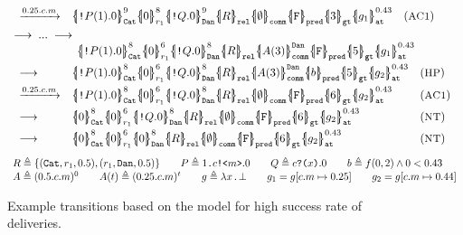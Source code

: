 \begin{figure}[t]
{\[\begin{array}{l}
\begin{array}{lll}
\xrightarrow{0.25.c.m}&
\pcellb{\comp{P(1).0}}{9}{\cn{Cat}}
\pcellb{0}{8}{r_1}
\pcellb{\comp{Q.0}}{9}{\cn{Dan}} 
\qcellb{R}{\cn{rel}}
\qcellb{\emptyset}{\cn{comm}}
\qcellb{\cn{F}}{\cn{pred}}
\qcellb{3}{\cn{gt}}
\pcellb{g_1}{0.43}{\cn{at}}
&
(\rulelab{AC1})
\end{array}
\\[0.5em]
\longrightarrow\;...\;\longrightarrow\\
\qquad\qquad\quad\;\;
\pcellb{\comp{P(1).0}}{8}{\cn{Cat}}
\pcellb{0}{6}{r_1}
\pcellb{\comp{Q.0}}{8}{\cn{Dan}} 
\qcellb{R}{\cn{rel}}
\pcellb{A(3)}{\cn{Dan}}{\cn{comm}}
\qcellb{\cn{F}}{\cn{pred}}
\qcellb{5}{\cn{gt}}
\pcellb{g_1}{0.43}{\cn{at}}
\\[0.5em]
\begin{array}{lll}
\longrightarrow&
\pcellb{\comp{P(1).0}}{8}{\cn{Cat}}
\pcellb{0}{6}{r_1}
\pcellb{\comp{Q.0}}{8}{\cn{Dan}} 
\qcellb{R}{\cn{rel}}
\pcellb{A(3)}{\cn{Dan}}{\cn{comm}}
\qcellb{b}{\cn{pred}}
\qcellb{5}{\cn{gt}}
\pcellb{g_2}{0.43}{\cn{at}}
&
(\rulelab{HP})
\\[0.5em]
\xrightarrow{0.25.c.m}  &
\pcellb{\comp{P(1).0}}{8}{\cn{Cat}}
\pcellb{0}{6}{r_1}
\pcellb{\comp{Q.0}}{8}{\cn{Dan}} 
\qcellb{R}{\cn{rel}}
\qcellb{\emptyset}{\cn{comm}}
\qcellb{\cn{F}}{\cn{pred}}
\qcellb{6}{\cn{gt}}
\pcellb{g_2}{0.43}{\cn{at}}
&
(\rulelab{AC1})
\\[0.5em]
\longrightarrow&
\pcellb{0}{8}{\cn{Cat}}
\pcellb{0}{6}{r_1}
\pcellb{\comp{Q.0}}{8}{\cn{Dan}} 
\qcellb{R}{\cn{rel}}
\qcellb{\emptyset}{\cn{comm}}
\qcellb{\cn{F}}{\cn{pred}}
\qcellb{6}{\cn{gt}}
\pcellb{g_2}{0.43}{\cn{at}}
&
(\rulelab{NT})
\\[0.5em]
\longrightarrow&
\pcellb{0}{8}{\cn{Cat}}
\pcellb{0}{6}{r_1}
\pcellb{0}{8}{\cn{Dan}} 
\qcellb{R}{\cn{rel}}
\qcellb{\emptyset}{\cn{comm}}
\qcellb{\cn{F}}{\cn{pred}}
\qcellb{6}{\cn{gt}}
\pcellb{g_2}{0.43}{\cn{at}}
&
(\rulelab{NT})
\end{array}
\end{array}
\]
}
{\footnotesize
\[
\begin{array}{l}
R\triangleq\{(\texttt{Cat},r_1,0.5), (r_1,\texttt{Dan},0.5)\}
\qquad
P\triangleq1\texttt{.}c\texttt{!<}m\texttt{>}.0
\qquad
Q\triangleq c\texttt{?(}x\texttt{)}.0
\qquad
b\triangleq f(0,2)\wedge 0 < 0.43
\\
A\triangleq (0.5.c.m)^0
\qquad
A(t)\triangleq (0.25.c.m)^t
\qquad
g\triangleq\lambda x\,.\,\bot
\qquad
g_1=g[c.m \mapsto 0.25]
\qquad
g_2=g[c.m \mapsto 0.44]
\end{array}
\]
}
\caption{Example transitions based on the model for high success rate of deliveries.}
  \label{fig:q-pi-example1}
\end{figure}

